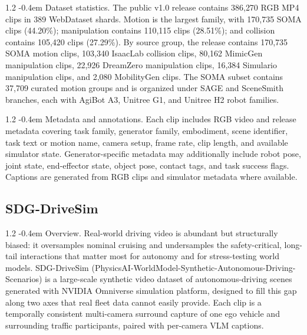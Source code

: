 \documentclass{llmxive}
\makeatletter
\providecommand{\paragraph}{  \@startsection{paragraph}{4}{\z@}    {1\baselineskip \@plus .2\baselineskip}    {-0.4em}    {\normalfont\normalsize\bfseries}}
\makeatother
\begin{document}
\paragraph{Dataset statistics.}
\label{appendix:sdg_robotsim_dataset_statistics}
The public v1.0 release contains 386{,}270 RGB MP4 clips in 389 WebDataset shards. Motion is the largest family, with 170{,}735 SOMA clips (44.20\%); manipulation contains 110{,}115 clips (28.51\%); and collision contains 105{,}420 clips (27.29\%). By source group, the release contains 170{,}735 SOMA motion clips, 103{,}340 IsaacLab collision clips, 80{,}162 MimicGen manipulation clips, 22{,}926 DreamZero manipulation clips, 16{,}384 Simulario manipulation clips, and 2{,}080 MobilityGen clips. The SOMA subset contains 37{,}709 curated motion groups and is organized under SAGE and SceneSmith branches, each with AgiBot A3, Unitree G1, and Unitree H2 robot families.

\paragraph{Metadata and annotations.}
\label{appendix:sdg_robotsim_metadata_annotations}
Each clip includes RGB video and release metadata covering task family, generator family, embodiment, scene identifier, task text or motion name, camera setup, frame rate, clip length, and available simulator state. Generator-specific metadata may additionally include robot pose, joint state, end-effector state, object pose, contact tags, and task success flags. Captions are generated from RGB clips and simulator metadata where available.

\subsection{SDG-DriveSim}
\label{appendix:sdg_drivesim}

\paragraph{Overview.}
\label{appendix:sdg_drivesim_overview}
Real-world driving video is abundant but structurally biased: it oversamples nominal cruising and undersamples the safety-critical, long-tail interactions that matter most for autonomy and for stress-testing world models. SDG-DriveSim (PhysicsAI-WorldModel-Synthetic-Autonomous-Driving-Scenarios) is a large-scale synthetic video dataset of autonomous-driving scenes generated with NVIDIA Omniverse simulation platform, designed to fill this gap along two axes that real fleet data cannot easily provide. Each clip is a temporally consistent multi-camera surround capture of one ego vehicle and surrounding traffic participants, paired with per-camera VLM captions.
\end{document}
